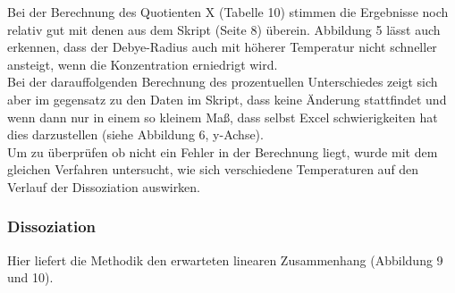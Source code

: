 Bei der Berechnung des Quotienten X (Tabelle 10) stimmen die Ergebnisse noch relativ gut mit denen aus dem Skript (Seite 8) überein. Abbildung 5 lässt auch erkennen,
dass der Debye-Radius auch mit höherer Temperatur nicht schneller ansteigt, wenn die Konzentration erniedrigt wird. \\
Bei der darauffolgenden Berechnung des prozentuellen Unterschiedes zeigt sich aber im gegensatz zu den Daten im Skript, dass keine Änderung stattfindet und wenn
dann nur in einem so kleinem Maß, dass selbst Excel schwierigkeiten hat dies darzustellen (siehe Abbildung 6, y-Achse). \\
Um zu überprüfen ob nicht ein Fehler in der Berechnung liegt, wurde mit dem gleichen Verfahren untersucht, wie sich verschiedene Temperaturen auf den Verlauf der 
Dissoziation auswirken.

\subsubsection{Dissoziation}

Hier liefert die Methodik den erwarteten linearen Zusammenhang (Abbildung 9 und 10). 





